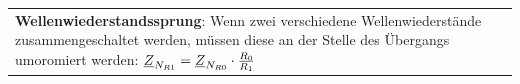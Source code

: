 \documentclass{article}
\begin{document}
\begin{twocolumn}
\begin{tabular}{p{}}
  \textbf{Wellenwiederstandssprung}: Wenn zwei verschiedene Wellenwiederstände zusammengeschaltet werden, müssen diese an der Stelle des Übergangs umoromiert werden: $\underline{Z}_{N_{R1}} = \underline{Z}_{N_{R0}} \cdot \frac{R_0}{R_1}$
\end{tabular}

\end{twocolumn}
\end{document}
